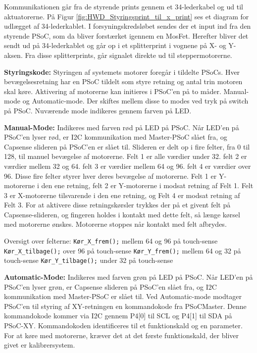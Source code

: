 Kommunikationen går fra de styrende prints gennem et 34-lederkabel og ud til aktuatorerne. På Figur \ref{fig:HWD_Styringsprint_til_x_print} ses et diagram for udlægget af 34-lederkablet. I forsyningskredsløbet sendes der et input ind fra den styrende PSoC, som da bliver forstærket igennem en MosFet. Herefter bliver det sendt ud på 34-lederkablet og går op i et splitterprint i vognene på X- og Y-aksen. Fra disse splitterprints, går signalet direkte ud til steppermotorerne. 


\textbf{Styringskode:}\newline 
Styringen af systemets motorer foregår i tildelte PSoCs. Hver bevægelsesretning har en PSoC tildelt som styre retning og antal trin motoren skal køre. Aktivering af motorerne kan initieres i PSoC'en på to måder. Manual-mode og Automatic-mode. Der skiftes mellem disse to modes ved tryk på switch på PSoC. Nuværende mode indikeres gennem farven på LED.

\textbf{Manual-Mode:} Indikeres med farven rød på LED på PSoC.\newline 
Når LED’en på PSoC’en lyser rød, er I2C kommunikation med Master-PSoC slået fra, og Capsense slideren på PSoC’en er slået til. 
Slideren er delt op i fire felter, fra 0 til 128, til manuel bevægelse af motorerne.  Felt 1 er alle værdier under 32. felt 2 er værdier mellem 32 og 64. felt 3 er værdier mellem 64 og 96. felt 4 er værdier over 96.
Disse fire felter styrer hver deres bevægelse af motorerne. Felt 1 er Y-motorerne i den ene retning, felt 2 er Y-motorerne i modsat retning af Felt 1. Felt 3 er X-motorerne tilsvarende i den ene retning, og Felt 4 er modsat retning af Felt 3. 
For at aktivere disse retningskørsler trykkes der på et givent felt på Capsense-slideren, og fingeren holdes i kontakt med dette felt, så længe kørsel med motorerne ønskes. Motorerne stoppes når kontakt med felt afbrydes.\newline 

Oversigt over felterne:\newline
\verb+Kør_X_frem();+       mellem 64 og 96 på touch-sense\newline
\verb+Kør_X_tilbage();+      over 96 på touch-sense\newline
\verb+Kør_Y_frem();+	   mellem 64 og 32 på touch-sense\newline
\verb+Kør_Y_tilbage();+	     under 32 på touch-sense\newline

\textbf{Automatic-Mode:} Indikeres med farven grøn på LED på PSoC.\newline 
Når LED’en på PSoC’en lyser grøn, er Capsense slideren på PSoC’en slået fra, og I2C kommunikation med Master-PSoC er slået til. 
Ved Automatic-mode modtager PSoC’en til styring af XY-retningen en kommandokode fra PSoCMaster. Denne kommandokode kommer via I2C gennem  P4[0] til SCL og P4[1] til SDA på PSoC-XY.
Kommandokoden identificeres til et funktionskald og en parameter. For at køre med motorerne, kræver det at det første funktionskald, der bliver givet er kalibrer\textunderscore{}system. 

